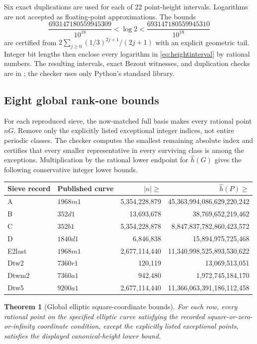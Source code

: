 \documentclass[11pt,letterpaper]{article}
\newtheorem{theorem}{Theorem}[section]
\theoremstyle{definition}\newtheorem{definition}[theorem]{Definition}
\theoremstyle{remark}\newtheorem{remark}[theorem]{Remark}
\begin{document}
Six exact duplications are used for each of 22 point-height intervals. Logarithms are not accepted as floating-point approximations. The bounds
\[
\frac{693147180559945309}{10^{18}}<\log2<
\frac{693147180559945310}{10^{18}}
\]
are certified from $2\sum_{j\ge0}(1/3)^{2j+1}/(2j+1)$ with an explicit geometric tail. Integer bit lengths then enclose every logarithm in \eqref{eq:heightinterval} by rational numbers. The resulting intervals, exact Bezout witnesses, and duplication checks are in ; the checker uses only Python's standard library.

\subsection{Eight global rank-one bounds}
For each reproduced sieve, the now-matched full basis makes every rational point $nG$. Remove only the explicitly listed exceptional integer indices, not entire periodic classes. The checker computes the smallest remaining absolute index and certifies that every smaller representative in every surviving class is among the exceptions. Multiplication by the rational lower endpoint for $\widehat h(G)$ gives the following conservative integer lower bounds.
\begin{center}
\small\setlength{\tabcolsep}{5pt}
\begin{tabular}{llrr}
\toprule
Sieve record & Published curve & $|n|\ge$ & $\widehat h(P)\ge$\\
\midrule
A & $1968m1$ & 5,354,228,879 & 45,363,994,086,629,220,242\\
B & $352d1$ & 13,693,678 & 38,769,652,219,462\\
C & $352b1$ & 5,354,228,878 & 8,847,837,782,860,423,572\\
D & $1840d1$ & 6,846,838 & 15,894,975,725,468\\
E2last & $1968m1$ & 2,677,114,440 & 11,340,998,525,893,530,622\\
Dtw2 & $7360r1$ & 120,119 & 13,069,513,051\\
Dtwm2 & $7360a1$ & 942,480 & 1,972,745,184,170\\
Dtw5 & $9200a1$ & 2,677,114,440 & 11,366,063,391,186,112,458\\
\bottomrule
\end{tabular}
\end{center}
\begin{theorem}[Global elliptic square-coordinate bounds]\label{thm:globalheights}
For each row, every rational point on the specified elliptic curve satisfying the recorded square-or-zero-or-infinity coordinate condition, except the explicitly listed exceptional points, satisfies the displayed canonical-height lower bound.
\end{theorem}
\end{document}
